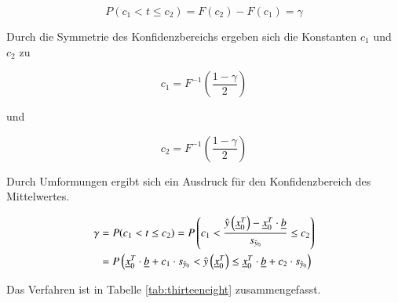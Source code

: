 \begin{equation}\label{eq:thirteenseventysix}
P(c_{1} <t\le c_{2})=F(c_{2})-F(c_{1})=\gamma
\end{equation}

\noindent Durch die Symmetrie des Konfidenzbereichs ergeben sich die Konstanten $c_{1}$ und $c_{2}$ zu

\begin{equation}\label{eq:thirteenseventyseven}
c_{1} =F^{-1} \left(\frac{1-\gamma }{2} \right)
\end{equation}

\noindent und

\begin{equation}\label{eq:thirteenseventyeight}
c_{2} =F^{-1} \left(\frac{1-\gamma }{2} \right)
\end{equation}

\noindent Durch Umformungen ergibt sich ein Ausdruck f\"{u}r den Konfidenzbereich des Mittelwertes.

\begin{equation}\label{eq:thirteenseventynine}
\begin{split}
\gamma & = P(c_{1} <t\le c_{2})=P\left(c_{1} <\dfrac{\hat{y}\left(\underline{x}_{0}^{T} \right)-\underline{x}_{0}^{T} \cdot \underline{b}}{s_{\hat{y}_{0} } } \le c_{2} \right) \\
& = P\left(\underline{x}_{0}^{T} \cdot \underline{b}+c_{1} \cdot s_{\hat{y}_{0} } <\hat{y}\left(\underline{x}_{0}^{T} \right)\le \underline{x}_{0}^{T} \cdot \underline{b}+c_{2} \cdot s_{\hat{y}_{0} } \right)
\end{split}
\end{equation}

\noindent Das Verfahren ist in Tabelle \ref{tab:thirteeneight} zusammengefasst.

\clearpage

